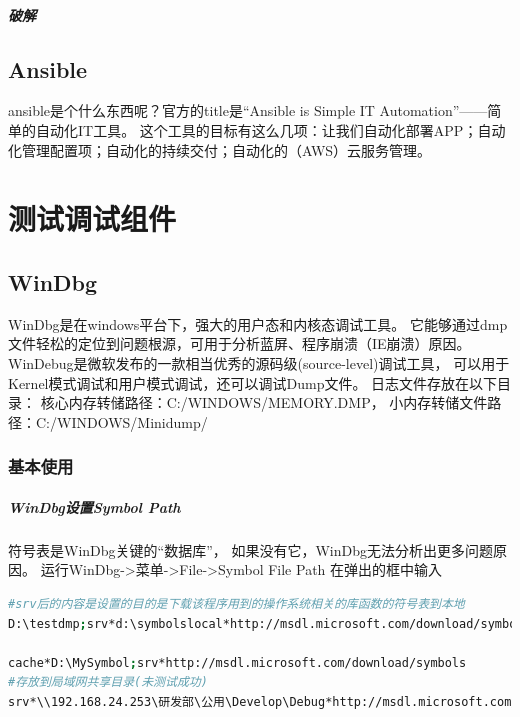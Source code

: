 \documentclass{book}
\begin{document}
\paragraph{破解}

\section{Ansible}

ansible是个什么东西呢？官方的title是“Ansible is Simple IT Automation”——简单的自动化IT工具。
这个工具的目标有这么几项：让我们自动化部署APP；自动化管理配置项；自动化的持续交付；自动化的（AWS）云服务管理。




\chapter{测试调试组件}

\clearpage

\section{WinDbg}

WinDbg是在windows平台下，强大的用户态和内核态调试工具。
它能够通过dmp文件轻松的定位到问题根源，可用于分析蓝屏、程序崩溃（IE崩溃）原因。
WinDebug是微软发布的一款相当优秀的源码级(source-level)调试工具，
可以用于Kernel模式调试和用户模式调试，还可以调试Dump文件。
日志文件存放在以下目录：
核心内存转储路径：C:/WINDOWS/MEMORY.DMP，
小内存转储文件路径：C:/WINDOWS/Minidump/

\subsection{基本使用}

\paragraph{WinDbg设置Symbol Path}符号表是WinDbg关键的“数据库”，
如果没有它，WinDbg无法分析出更多问题原因。
运行WinDbg->菜单->File->Symbol File Path
在弹出的框中输入

\begin{lstlisting}[language=Bash]
#srv后的内容是设置的目的是下载该程序用到的操作系统相关的库函数的符号表到本地
D:\testdmp;srv*d:\symbolslocal*http://msdl.microsoft.com/download/symbols

cache*D:\MySymbol;srv*http://msdl.microsoft.com/download/symbols
#存放到局域网共享目录(未测试成功)
srv*\\192.168.24.253\研发部\公用\Develop\Debug*http://msdl.microsoft.com/download/symbols
\end{lstlisting}
\end{document}
